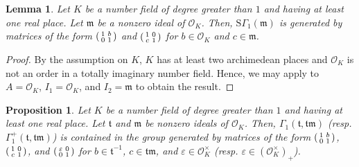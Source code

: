 \documentclass[11pt]{amsart}
\newtheorem{lemma}[theorem]{Lemma}
\newtheorem{prop}[theorem]{Proposition}
\theoremstyle{remark}
\newcommand\sm[1]{\begin{psmallmatrix}#1\end{psmallmatrix}}
\newcommand\fr[1]{\mathfrak{#1}}
\newcommand{\eps}{\varepsilon}
\newcommand{\clo}{\mathcal{O}}
\newcommand{\SG}{\mathrm{S}\Gamma}
\begin{document}
\begin{lemma}
\label{sgamma1-generator}
Let $K$ be a number field of degree greater than $1$ and having at least one real place. Let $\fr{m}$ be a nonzero ideal of $\clo_K$. Then, $\SG_1(\fr{m})$ is generated by matrices of the form $\sm{1&b\\0&1}$ and $\sm{1&0\\c&1}$ for $b\in\clo_K$ and $c\in\fr{m}$.
\end{lemma}
\begin{proof}
By the assumption on $K$, $K$ has at least two archimedean places and $\clo_K$ is not an order in a totally imaginary number field. Hence, we may apply  to $A=\clo_K$, $I_1=\clo_K$, and $I_2=\fr{m}$ to obtain the result.
\end{proof}

\begin{prop}
\label{gamma1-generator}
Let $K$ be a number field of degree greater than $1$ and having at least one real place. Let $\fr{t}$ and $\fr{m}$ be nonzero ideals of $\clo_K$. Then, $\Gamma_1(\fr{t},\fr{tm})$ (resp. $\Gamma_1^+(\fr{t},\fr{tm})$) is contained in the group generated by matrices of the form $\sm{1&b\\0&1}$, $\sm{1&0\\c&1}$, and $\sm{\eps&0\\0&1}$ for $b\in\fr{t}^{-1}$, $c\in\fr{tm}$, and $\eps\in\clo_K^\times$ (resp. $\eps\in(\clo_K^\times)_+$).
\end{prop}
\end{document}
